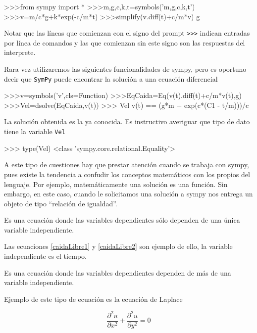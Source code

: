  \begin{pyverbatim}
>>>from sympy import *
>>>m,g,c,k,t=symbols('m,g,c,k,t')
>>>v=m/c*g+k*exp(-c/m*t)
>>>simplify(v.diff(t)+c/m*v)
g
 \end{pyverbatim}
Notar que las líneas que comienzan con el signo del prompt \verb~>>>~ indican entradas por línea de comandos y las que comienzan sin este signo son las respuestas del interprete.

Rara vez utilizaremos las siguientes funcionalidades de sympy, pero es oportuno decir que
 \texttt{SymPy} puede encontrar la solución a una ecuación diferencial

 \begin{pyverbatim}
>>>v=symbols('v',cls=Function)
>>>EqCaida=Eq(v(t).diff(t)+c/m*v(t),g)
>>>Vel=dsolve(EqCaida,v(t))
>>> Vel
v(t) == (g*m + exp(c*(C1 - t/m)))/c
 \end{pyverbatim}

La solución obtenida es la ya conocida. Es instructivo averiguar que tipo de dato tiene la variable \verb~Vel~

 \begin{pyverbatim}
>>> type(Vel)
<class 'sympy.core.relational.Equality'>
 \end{pyverbatim}
A este tipo de cuestiones hay que prestar atención cuando se trabaja con sympy, 
pues existe la tendencia a confudir los conceptos matemáticos con los propios del lenguaje. 
Por ejemplo, matemáticamente una solución es una función. Sin embargo, en este caso, 
cuando le solicitamos una solución a sympy nos entrega un objeto de tipo  
``relación de igualdad''.





\begin{definicion}{} Es una ecuación donde las variables dependientes sólo dependen de una única variable independiente.
\end{definicion}

Las
ecuaciones \eqref{caidaLibre1} y \eqref{caidaLibre2} son ejemplo de ello, la variable independiente es el tiempo.
  \begin{definicion}{} Es una ecuación donde las variables dependientes dependen de más de una variable independiente.
   \end{definicion}

Ejemplo de este tipo de ecuación es la ecuación de Laplace

\[\frac{\partial^2 u}{\partial x^2}+\frac{\partial^2 u}{\partial y^2}=0\]

